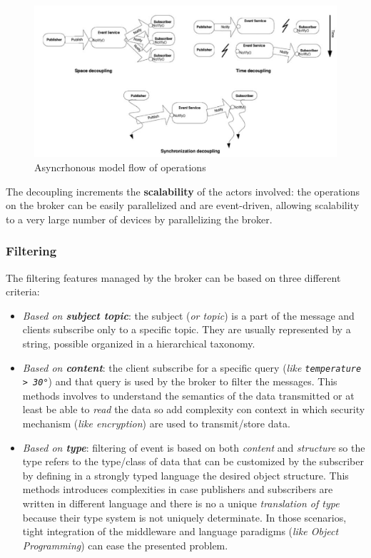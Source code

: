 \documentclass[10pt,a4paper]{report}
\theoremstyle{definition}
\begin{document}
\begin{figure}[h]
	\centering\includegraphics[scale=0.40]{images/Pasted image 20230301091741.png}
	\caption{Asyncrhonous model flow of operations}\label{mqtt-example1}

\end{figure}

The decoupling increments the \textbf{scalability} of the actors involved: the operations on the broker can be easily parallelized and are event-driven, allowing scalability to a very large number of devices by parallelizing the broker.
\subsubsection{Filtering}\label{sec:filtering}
The filtering features managed by the broker can be based on three different criteria:
\begin{itemize}
	\item 
	\textit{Based on \textbf{subject topic}}: the subject (\textit{or topic}) is a part of the message and clients subscribe only to a specific topic. They are usually represented by a string, possible organized in a hierarchical taxonomy.
	\item 
	\textit{Based on \textbf{content}}: the client subscribe for a specific query (\textit{like \texttt{temperature > 30°}}) and that query is used by the broker to filter the messages. This methods involves to understand the semantics of the data transmitted or at least be able to \textit{read} the data so add complexity con context in which security mechanism (\textit{like encryption}) are used to transmit/store data.
	\item 
	\textit{Based on \textbf{type}}: filtering of event is based on both \textit{content} and \textit{structure} so the type refers to the type/class of data that can be customized by the subscriber by defining in a strongly typed language the desired object structure. This methods introduces complexities in case publishers and subscribers are written in different language and there is no a unique \textit{translation of type} because their type system is not uniquely determinate. In those scenarios, tight integration of the middleware and language paradigms (\textit{like Object Programming}) can ease the presented problem.
\end{itemize}
\end{document}
